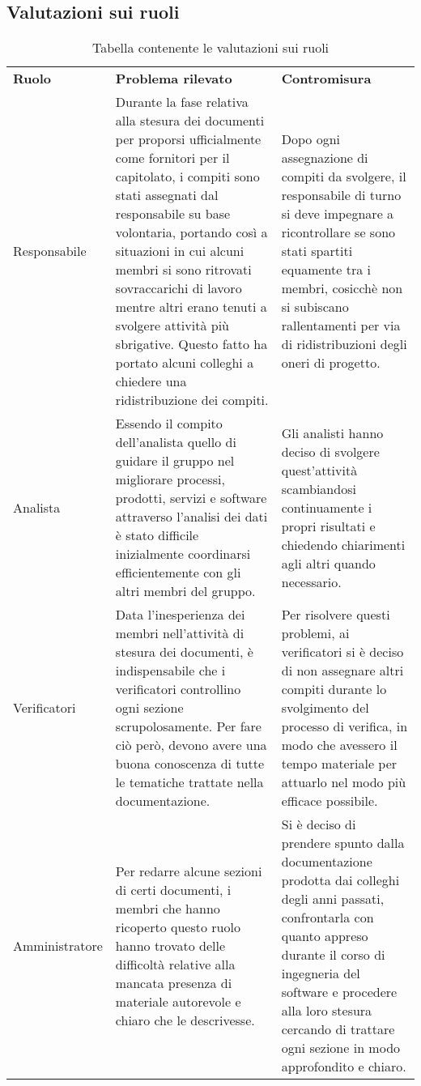 \subsection{Valutazioni sui ruoli}
\begin{table} [h!]
	\begin{center}
		\begin{tabular} { m{3cm} m{7cm} m{6cm} }
			\rowcolor{lightgray}
			\textbf{Ruolo} & \textbf{Problema rilevato} & \textbf{Contromisura}\\
			Responsabile & Durante la fase relativa alla stesura dei documenti per proporsi ufficialmente come fornitori per il capitolato, i compiti sono stati assegnati dal responsabile su base volontaria, portando così a situazioni in cui alcuni membri si sono ritrovati sovraccarichi di lavoro
			mentre altri erano tenuti a svolgere attività più sbrigative. Questo fatto ha portato alcuni colleghi a chiedere una ridistribuzione dei compiti.& Dopo ogni assegnazione di compiti da svolgere, il responsabile di turno si deve impegnare a ricontrollare se sono stati spartiti equamente tra i membri, cosicchè non si subiscano rallentamenti per via di ridistribuzioni degli oneri di progetto. \\			
			Analista & 	Essendo il compito dell'analista quello di guidare il gruppo nel migliorare processi, prodotti, servizi e software attraverso l'analisi dei dati è stato difficile inizialmente coordinarsi efficientemente con gli altri membri del gruppo. & Gli analisti hanno deciso di svolgere quest’attività scambiandosi continuamente i propri risultati e chiedendo chiarimenti agli altri quando necessario.\\
			Verificatori &	Data l’inesperienza dei membri nell’attività di stesura dei documenti, è indispensabile che i verificatori controllino ogni sezione scrupolosamente.	Per fare ciò però,  devono avere una buona conoscenza di tutte le tematiche trattate nella documentazione. & Per risolvere questi problemi, ai verificatori
			si è deciso di non assegnare altri compiti durante lo svolgimento del processo di verifica, in
			modo che avessero il tempo materiale per attuarlo nel modo più efficace possibile.\\
			Amministratore & Per redarre alcune sezioni di certi documenti, i membri che hanno ricoperto questo ruolo hanno trovato delle difficoltà relative alla mancata presenza di materiale autorevole e chiaro che le descrivesse. & Si è deciso di prendere spunto dalla documentazione prodotta dai colleghi degli anni passati, confrontarla con quanto appreso durante il corso di ingegneria del software e procedere alla loro stesura cercando di trattare ogni sezione in modo approfondito e chiaro.
		\end{tabular}
\end{center}
\caption{Tabella contenente le valutazioni sui ruoli}
\end{table}

